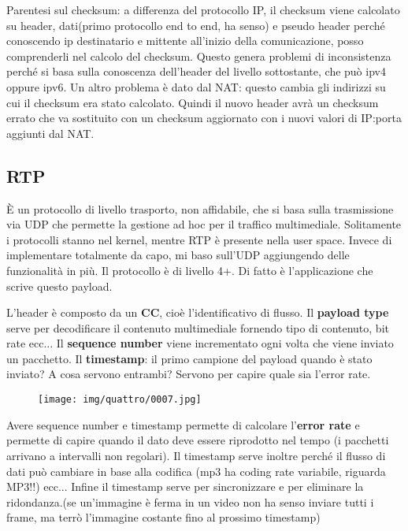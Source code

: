 \documentclass{article}
\begin{document}
\noindent Parentesi sul checksum: a differenza del protocollo IP, il checksum viene calcolato su header, dati(primo protocollo end to end, ha senso) e pseudo header perché
 conoscendo ip destinatario e mittente all'inizio della comunicazione, posso comprenderli nel calcolo del checksum. 
Questo genera problemi di inconsistenza perché si basa sulla conoscenza dell'header del livello sottostante, che può ipv4 oppure ipv6.
Un altro problema è dato dal NAT: questo cambia gli indirizzi su cui il checksum era stato calcolato. Quindi il nuovo header avrà un checksum errato che va sostituito con un
checksum aggiornato con i nuovi valori di IP:porta aggiunti dal NAT.

\subsection{RTP}

\noindent È un protocollo di livello trasporto, non affidabile, che si basa sulla trasmissione via UDP che permette la gestione ad hoc per il traffico multimediale. Solitamente i protocolli
stanno nel kernel, mentre RTP è presente nella user space. Invece di implementare totalmente da capo, mi baso sull'UDP aggiungendo delle funzionalità in più. Il protocollo è 
di livello 4+. Di fatto è l'applicazione che scrive questo payload.
\medskip

\noindent L'header è composto da un \textbf{CC}, cioè l'identificativo di flusso. Il \textbf{payload type} serve per decodificare il contenuto multimediale fornendo tipo di contenuto,
bit rate ecc... Il \textbf{sequence number} viene incrementato ogni volta che viene inviato un pacchetto. Il \textbf{timestamp}: il primo campione del payload quando è stato inviato?
A cosa servono entrambi? Servono per capire quale sia l'error rate.


\begin{figure}[!ht]
    \begin{center}
        \texttt{[image: img/quattro/0007.jpg]}         
    \end{center}
\end{figure}

\noindent Avere sequence number e timestamp permette di calcolare l'\textbf{error rate} e permette di capire quando il dato deve essere riprodotto nel tempo (i pacchetti
 arrivano a intervalli non regolari). Il timestamp serve inoltre perché il flusso di dati può cambiare in base alla codifica (mp3 ha coding rate variabile, riguarda MP3!!) ecc... Infine il timestamp serve per
 sincronizzare e per eliminare la ridondanza.(se un'immagine è ferma in un video   non ha senso inviare tutti i frame, ma terrò l'immagine costante fino al prossimo timestamp)
\medskip
\end{document}
